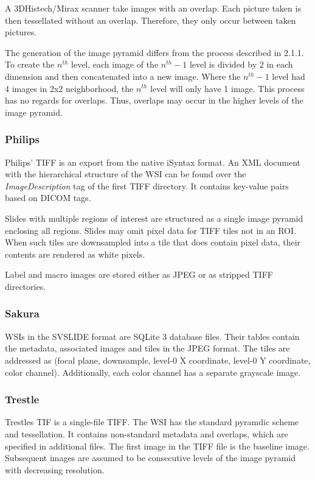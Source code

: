 A 3DHistech/Mirax scanner take images with an overlap. Each picture taken is then tessellated without an overlap. Therefore, they only occur between taken pictures\cite{web:openslide}.

The generation of the image pyramid differs from the process described in 2.1.1. To create the $n^{th}$ level, each image of the $n^{th}-1$ level is divided by 2 in each dimension and then concatenated into a new image. Where the $n^{th}-1$ level had 4 images in 2x2 neighborhood, the $n^{th}$ level will only have 1 image. This process has no regards for overlaps. Thus, overlaps may occur in the higher levels of the image pyramid\cite{web:openslide}.


\subsubsection{Philips}
Philips' TIFF is an export from the native iSyntax format. An XML document with the hierarchical structure of the WSI can be found over the \emph{ImageDescription} tag of the first TIFF directory. It contains key-value pairs based on DICOM tags\cite{web:openslide}.

Slides with multiple regions of interest are structured as a single image pyramid enclosing all regions. Slides may omit pixel data for TIFF tiles not in an ROI. When such tiles are downsampled into a tile that does contain pixel data, their contents are rendered as white pixels\cite{web:openslide}.

Label and macro images are stored either as JPEG or as stripped TIFF directories.


\subsubsection{Sakura}
WSIs in the SVSLIDE format are SQLite 3 database files. Their tables contain the metadata, associated images and tiles in the JPEG format. The tiles are addressed as (focal plane, downsample, level-0 X coordinate, level-0 Y coordinate, color channel). Additionally, each color channel has a separate grayscale image\cite{web:openslide}.


\subsubsection{Trestle}
Trestles TIF is a single-file TIFF. The WSI has the standard pyramdic scheme and tessellation. It contains non-standard metadata and overlaps, which are specified in additional files. The first image in the TIFF file is the baseline image. Subsequent images are assumed to be consecutive levels of the image pyramid with decreasing resolution\cite{web:openslide}.


